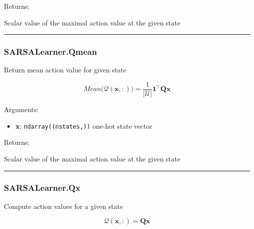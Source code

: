 Returns:

Scalar value of the maximal action value at the given state

\begin{center}\rule{0.5\linewidth}{\linethickness}\end{center}

\hypertarget{sarsalearner.qmean}{%
\subsubsection{SARSALearner.Qmean}\label{sarsalearner.qmean}}

\begin{Shaded}
\begin{Highlighting}[]
\end{Highlighting}
\end{Shaded}

Return mean action value for given state

\[
Mean \big(\mathcal Q(\mathbf x, :)\big) = \frac{1}{|\mathcal U|} \mathbf 1^\top \mathbf Q \mathbf x
\]

Arguments:

\begin{itemize}
\tightlist
\item
  \textbf{x}: \texttt{ndarray((nstates,))} one-hot state vector
\end{itemize}

Returns:

Scalar value of the maximal action value at the given state

\begin{center}\rule{0.5\linewidth}{\linethickness}\end{center}

\hypertarget{sarsalearner.qx}{%
\subsubsection{SARSALearner.Qx}\label{sarsalearner.qx}}

\begin{Shaded}
\begin{Highlighting}[]
\end{Highlighting}
\end{Shaded}

Compute action values for a given state

\[
\mathcal Q(\mathbf x, :) = \mathbf Q \mathbf x
\]

